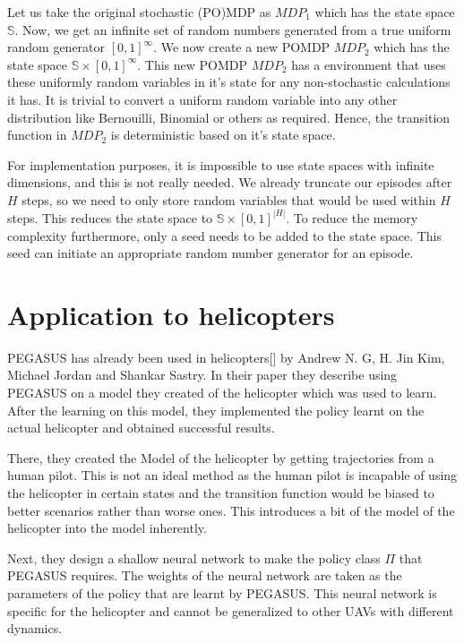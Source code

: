 \documentclass[BTech]{iitmdiss}
\begin{document}
Let us take the original stochastic (PO)MDP as $MDP_{1}$ which has the state space $\mathbb{S}$. Now, we get an infinite set of random numbers generated from a true uniform random generator $[0,1]^{\infty}$. We now create a new POMDP $MDP_{2}$ which has the state space $\mathbb{S} \times [0,1]^{\infty}$. This new POMDP $MDP_{2}$ has a environment that uses these uniformly random variables in it's state for any non-stochastic calculations it has. It is trivial to convert a uniform random variable into any other distribution like Bernouilli, Binomial or others as required. Hence, the transition function in $MDP_{2}$ is deterministic based on it's state space.

For implementation purposes, it is impossible to use state spaces with infinite dimensions, and this is not really needed. We already truncate our episodes after $H$ steps, so we need to only store random variables that would be used within $H$ steps. This reduces the state space to $\mathbb{S} \times [0,1]^{|H|}$. To reduce the memory complexity furthermore, only a seed needs to be added to the state space. This seed can initiate an appropriate random number generator for an episode.

\section{Application to helicopters}

PEGASUS has already been used in helicopters[] by Andrew N. G, H. Jin Kim, Michael Jordan and Shankar Sastry. In their paper they describe using PEGASUS on a model they created of the helicopter which was used to learn. After the learning on this model, they implemented the policy learnt on the actual helicopter and obtained successful results.

There, they created the Model of the helicopter by getting trajectories from a human pilot. This is not an ideal method as the human pilot is incapable of using the helicopter in certain states and the transition function would be biased to better scenarios rather than worse ones. This introduces a bit of the model of the helicopter into the model inherently.

Next, they design a shallow neural network to make the policy class $\Pi$ that PEGASUS requires. The weights of the neural network are taken as the parameters of the policy that are learnt by PEGASUS. This neural network is specific for the helicopter and cannot be generalized to other UAVs with different dynamics.
\end{document}
